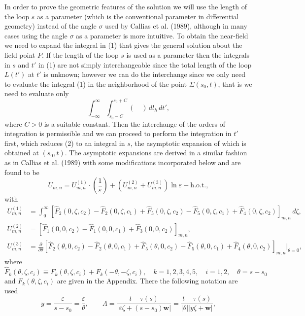 \documentclass[12pt]{article}
\begin{document}
In order to prove the geometric features of the solution we will use the length of the loop $s$ as a parameter (which is the conventional parameter in differential geometry) instead of the angle $\sigma$ used by Callias et al. (1989), although in many cases using the angle $\sigma$ as a parameter is more intuitive. To obtain the near-field we need to expand the integral in (1) that gives the general solution about the field point $P$. If the length of the loop $s$ is used as a parameter then the integrals in $s$ and $t'$ in (1) are not simply interchangeable since the total length of the loop $L(t')$ at $t'$ is unknown; however we can do the interchange since we only need to evaluate the integral (1) in the neighborhood of the point $\Sigma(s_0,t)$, that is we need to evaluate only
\begin{equation}
\int_{-\infty}^{\infty}\int_{s_0-C}^{s_0+C}(\quad)\,dl_h\,dt',
\end{equation}
where $C>0$ is a suitable constant. Then the interchange of the orders of integration is permissible and we can proceed to perform the integration in $t'$ first, which reduces (2) to an integral in $s$, the asymptotic expansion of which is obtained at $(s_0,t)$. The asymptotic expansions are derived in a similar fashion as in Callias et al. (1989) with some modifications incorporated below and are found to be
\begin{equation}
U_{m,n} = U_{m,n}^{(1)}\cdot\left(\frac{1}{\varepsilon}\right) + (U_{m,n}^{(2)} + U_{m,n}^{(3)})\ln\varepsilon + \text{h.o.t.},
\end{equation}
with
\begin{align*}
U_{m,n}^{(1)} &= \int_0^{\infty}[\hat{F}_2(0,\zeta,c_2) - \hat{F}_2(0,\zeta,c_1) + \hat{F}_5(0,\zeta,c_2) - \hat{F}_5(0,\zeta,c_1) + \hat{F}_4(0,\zeta,c_2)]_{m,n}\,d\zeta, \\
U_{m,n}^{(2)} &= [\hat{F}_1(0,0,c_2) - \hat{F}_1(0,0,c_1) + \hat{F}_3(0,0,c_2)]_{m,n}, \\
U_{m,n}^{(3)} &= \frac{\partial}{\partial\theta}[\hat{F}_2(\theta,0,c_2) - \hat{F}_2(\theta,0,c_1) + \hat{F}_5(\theta,0,c_2) - \hat{F}_5(\theta,0,c_1) + \hat{F}_4(\theta,0,c_2)]_{m,n}\big|_{\theta=0},
\end{align*}
where
\[
\hat{F}_k(\theta,\zeta,c_i) \equiv F_k(\theta,\zeta,c_i) + F_k(-\theta,-\zeta,c_i), \quad k=1,2,3,4,5, \quad i=1,2, \quad \theta = s - s_0
\]
and $F_k(\theta,\zeta,c_i)$ are given in the Appendix. There the following notation are used
\begin{equation}
y = \frac{\varepsilon}{s-s_0} = \frac{\varepsilon}{\theta}, \qquad \Lambda = \frac{t-\tau(s)}{|\varepsilon\zeta + (s-s_0)\mathbf{w}|} = \frac{t-\tau(s)}{|\theta||y\zeta+\mathbf{w}|},
\end{equation}
\end{document}
